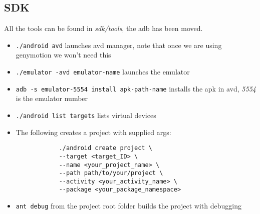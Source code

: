 \documentclass[a4paper, 12pt]{article}
\begin{document}
\subsection{SDK}
All the tools can be found in \emph{sdk/tools}, the adb has been moved.
\begin{itemize}
	\item \verb|./android avd| launches avd manager, note that once we are using genymotion we won't need this
	\item \verb|./emulator -avd emulator-name| launches the emulator
	\item \verb|adb -s emulator-5554 install apk-path-name| installs the apk in avd, \emph{5554} is the emulator number
	\item \verb|./android list targets| lists virtual devices
	\item The following creates a project with supplied args:
		\begin{verbatim}
			./android create project \
			--target <target_ID> \
			--name <your_project_name> \
			--path path/to/your/project \
			--activity <your_activity_name> \
			--package <your_package_namespace>
		\end{verbatim}
	\item \verb|ant debug| from the project root folder builds the project with debugging
\end{itemize}
\end{document}
